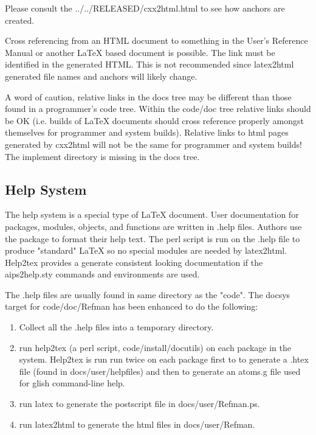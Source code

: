Please consult the 
{../../RELEASED/cxx2html.html} to see how anchors are created.

Cross referencing from an HTML document to something in the User's
Reference Manual or another LaTeX based document is possible.
The link must be identified 
in the generated HTML.  This is not recommended since latex2html generated
file names and anchors will likely change.

A word of caution, relative links in the docs tree may be different than those
found in a programmer's code tree.  Within the code/doc tree relative links
should be OK (i.e. builds of LaTeX documents should cross reference properly
amongst themselves for programmer and system builds).  Relative links to html
pages generated by cxx2html will not be the same for programmer and system
builds!  The implement directory is missing in the docs tree.



\subsection{Help System}
The help system is a special type of LaTeX document.  User documentation for
packages, modules, objects, and functions are written in .help files.
Authors use the  package to format their
help text.  The perl script  is run on the
.help file to produce "standard" LaTeX so no special modules are needed by
latex2html.
Help2tex provides a generate consistent looking documentation if the
aips2help.sty commands and environments are used.

The .help files are usually found in same directory as the "code".
The docsys target for code/doc/Refman has been enhanced to do the following:
\begin{enumerate}
\item Collect all the .help files into a temporary directory.
\item run help2tex (a perl script, code/install/docutils) on each package in
the system. Help2tex is run run twice on each package first to to generate
a .htex file (found in docs/user/helpfiles) and then to generate an atoms.g
file used for glish command-line help.
\item run latex to generate the postscript file in docs/user/Refman.ps.
\item run latex2html to generate the html files in docs/user/Refman.
\end{enumerate}


